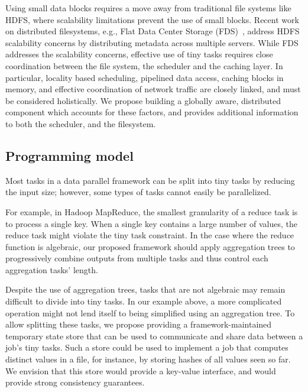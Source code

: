 Using small data blocks requires a move away from traditional file systems like
HDFS, where scalability limitations prevent the use of small blocks.
Recent work on distributed filesystems, e.g., Flat Data Center
Storage (FDS)~\cite{nightingale2012flat}, address HDFS scalability concerns by
distributing metadata across multiple servers. While FDS addresses the scalability
concerns, effective use of tiny tasks requires close coordination between the file
system, the scheduler and the caching layer.
In particular, locality based scheduling, pipelined data access, caching blocks in 
memory, and effective coordination of network traffic are closely linked, and 
must be considered holistically. We propose building a globally aware, distributed
component which accounts for these factors, and provides additional information to
both the scheduler, and the filesystem.

\subsection{Programming model}
\label{sec:prog}
Most tasks in a data parallel framework can be split into tiny tasks by
reducing the input size; however, some types of tasks cannot easily be
parallelized.

For example, in Hadoop MapReduce, the smallest granularity of a reduce task
is to process a single key.
When a single key contains a large number of values, the reduce task might
violate the tiny task constraint.
In the case where the reduce function is algebraic, our proposed framework should
apply aggregation trees to progressively combine outputs from multiple tasks and
thus control each aggregation tasks' length.



Despite the use of aggregation trees, tasks that are not algebraic may remain
difficult to divide into tiny tasks. 
In our example above, a more complicated operation might not lend itself to being
simplified using an aggregation tree.
To allow splitting these tasks, we propose providing a framework-maintained
temporary state store that can be used to communicate and share data between a
job's tiny tasks. Such a store could be used to implement a job that computes
distinct values in a file, for instance, by storing hashes of all values
seen so far. We envision that this store would provide a key-value interface,
and would provide strong consistency guarantees.

